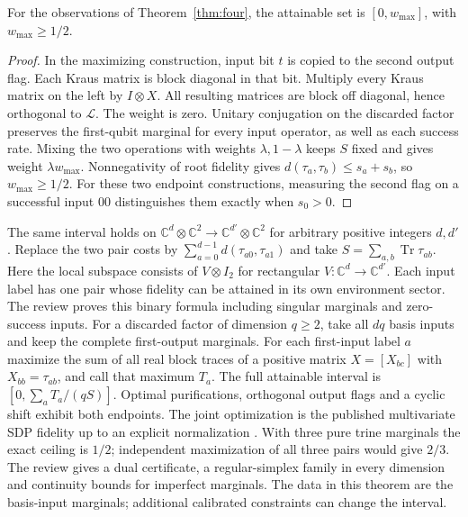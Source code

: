 \documentclass[11pt,letterpaper]{article}
\newcommand{\tr}{\operatorname{Tr}}\newcommand{\TV}{\operatorname{TV}}\newcommand{\E}{\mathbb E}\newcommand{\id}{\mathbb I}\newcommand{\calB}{\mathcal B}\newcommand{\norm}[1]{\left\lVert#1\right\rVert}
\begin{document}
\begin{corollary}\label{cor:interval}
For the observations of Theorem~\ref{thm:four}, the attainable set is $[0,w_{\max}]$, with $w_{\max}\ge1/2$.
\end{corollary}
\begin{proof}
In the maximizing construction, input bit $t$ is copied to the second output flag. Each Kraus matrix is block diagonal in that bit. Multiply every Kraus matrix on the left by $I\otimes X$. All resulting matrices are block off diagonal, hence orthogonal to $\mathcal L$. The weight is zero. Unitary conjugation on the discarded factor preserves the first-qubit marginal for every input operator, as well as each success rate. Mixing the two operations with weights $\lambda,1-\lambda$ keeps $S$ fixed and gives weight $\lambda w_{\max}$. Nonnegativity of root fidelity gives $d(\tau_a,\tau_b)\le s_a+s_b$, so $w_{\max}\ge 1/2$. For these two endpoint constructions, measuring the second flag on a successful input $00$ distinguishes them exactly when $s_0>0$.
\end{proof}

The same interval holds on $\mathbb C^d\otimes\mathbb C^2\to\mathbb C^{d'}\otimes\mathbb C^2$ for arbitrary positive integers $d,d'$. Replace the two pair costs by $\sum_{a=0}^{d-1}d(\tau_{a0},\tau_{a1})$ and take $S=\sum_{a,b}\tr\tau_{ab}$. Here the local subspace consists of $V\otimes I_2$ for rectangular $V:\mathbb C^d\to\mathbb C^{d'}$. Each input label has one pair whose fidelity can be attained in its own environment sector. The review proves this binary formula including singular marginals and zero-success inputs. For a discarded factor of dimension $q\ge2$, take all $dq$ basis inputs and keep the complete first-output marginals. For each first-input label $a$ maximize the sum of all real block traces of a positive matrix $X=[X_{bc}]$ with $X_{bb}=\tau_{ab}$, and call that maximum $T_a$. The full attainable interval is $[0,\sum_a T_a/(qS)]$. Optimal purifications, orthogonal output flags and a cyclic shift exhibit both endpoints. The joint optimization is the published multivariate SDP fidelity up to an explicit normalization \cite{multi}. With three pure trine marginals the exact ceiling is $1/2$; independent maximization of all three pairs would give $2/3$. The review gives a dual certificate, a regular-simplex family in every dimension and continuity bounds for imperfect marginals. The data in this theorem are the basis-input marginals; additional calibrated constraints can change the interval.
\end{document}
